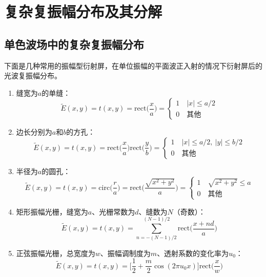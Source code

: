 \documentclass[cn,10pt,chinesefont=founder,math=mtpro2,cite=super,toc=onecol,twoside,openany]{elegantbook}
\begin{document}
\section{复杂复振幅分布及其分解}

\subsection{单色波场中的复杂复振幅分布}

下面是几种常用的振幅型衍射屏，在单位振幅的平面波正入射的情况下衍射屏后的光波复振幅分布。
\begin{enumerate}
	\item 缝宽为$a$的单缝：
		\begin{equation}
		\tilde{E}(x,y)=t(x,y)=\mathrm{rect}\bigg(\frac{x}{a}\bigg)=
		\begin{cases}
		1\quad |x|\leqslant a/2\\
		0\quad \text{其他}
		\end{cases}
		\end{equation}
	\item 边长分别为$a$和$b$的方孔：
		\begin{equation}
		\tilde{E}(x,y)=t(x,y)=\mathrm{rect}\bigg(\frac{x}{a}\bigg)\mathrm{rect}\bigg(\frac{y}{b}\bigg)=
		\begin{cases}
		1\quad |x|\leqslant a/2,\ |y|\leqslant b/2\\
		0\quad \text{其他}
		\end{cases}
		\end{equation}
	\item 半径为$a$的圆孔：
		\begin{equation}
		\tilde{E}(x,y)=t(x,y)=\mathrm{circ}\bigg(\frac{r}{a}\bigg)=\mathrm{rect}\Bigg(\frac{\sqrt{x^2+y^2}}{a}\Bigg)=
		\begin{cases}
		1\quad \sqrt{x^2+y^2}\leqslant a\\
		0\quad \text{其他}
		\end{cases}
		\end{equation}
	\item 矩形振幅光栅，缝宽为$a$、光栅常数为$d$、缝数为$N$（奇数）：
		\begin{equation}
		\tilde{E}(x,y)=t(x,y)=\sum_{n=-(N-1)/2}^{(N-1)/2}\mathrm{rect}\bigg(\frac{x+nd}{a}\bigg)
		\end{equation}
	\item 正弦振幅光栅，总宽度为$w$、振幅调制度为$m$、透射系数的变化率为$u_0$：
		\begin{equation}
		\tilde{E}(x,y)=t(x,y)=\bigg[\frac{1}{2}+\frac{m}{2}\cos(2\pi u_0x)\bigg]\mathrm{rect}\bigg(\frac{x}{w}\bigg)
		\end{equation}
\end{enumerate}
\end{document}
